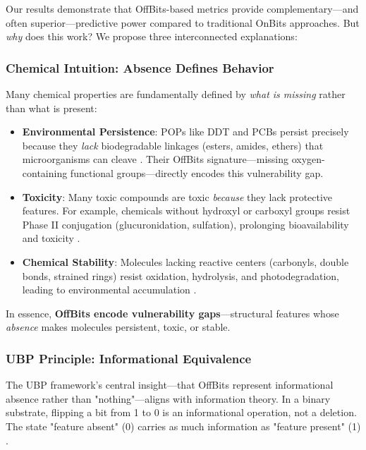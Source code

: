 \documentclass[11pt,letterpaper]{article}
\begin{document}
Our results demonstrate that OffBits-based metrics provide complementary—and often superior—predictive power compared to traditional OnBits approaches. But \textit{why} does this work? We propose three interconnected explanations:

\subsubsection{Chemical Intuition: Absence Defines Behavior}

Many chemical properties are fundamentally defined by \textit{what is missing} rather than what is present:

\begin{itemize}
    \item \textbf{Environmental Persistence}: POPs like DDT and PCBs persist precisely because they \textit{lack} biodegradable linkages (esters, amides, ethers) that microorganisms can cleave \cite{jones1999persistent}. Their OffBits signature—missing oxygen-containing functional groups—directly encodes this vulnerability gap.

    \item \textbf{Toxicity}: Many toxic compounds are toxic \textit{because} they lack protective features. For example, chemicals without hydroxyl or carboxyl groups resist Phase II conjugation (glucuronidation, sulfation), prolonging bioavailability and toxicity \cite{parkinson2015biotransformation}.

    \item \textbf{Chemical Stability}: Molecules lacking reactive centers (carbonyls, double bonds, strained rings) resist oxidation, hydrolysis, and photodegradation, leading to environmental accumulation \cite{schwarzenbach2003challenge}.
\end{itemize}

In essence, \textbf{OffBits encode vulnerability gaps}—structural features whose \textit{absence} makes molecules persistent, toxic, or stable.

\subsubsection{UBP Principle: Informational Equivalence}

The UBP framework's central insight—that OffBits represent informational absence rather than "nothing"—aligns with information theory. In a binary substrate, flipping a bit from 1 to 0 is an informational operation, not a deletion. The state "feature absent" (0) carries as much information as "feature present" (1) \cite{shannon1948mathematical}.
\end{document}
